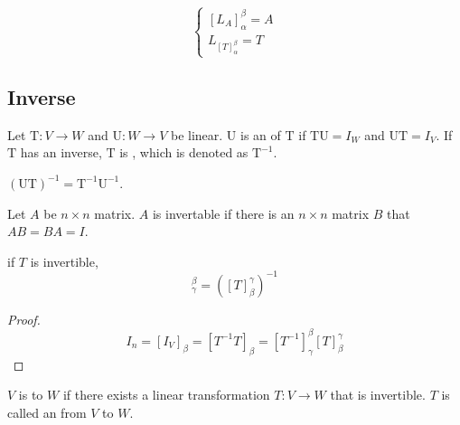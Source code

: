 \begin{theorem}
    \begin{equation}
        \begin{cases}
            [L_A]_\alpha^\beta = A \\
            L_{[T]_\alpha^\beta} = T
        \end{cases}
    \end{equation}
\end{theorem}


\subsection{Inverse}

\begin{definition}
	Let $\mathrm{T}: V\rightarrow W$ and $\mathrm{U}:W \rightarrow V$ be linear. $\mathrm{U}$ is an    of $\mathrm{T}$ if $\mathrm{TU} = I_W$ and $\mathrm{UT} = I_V$. If $\mathrm{T}$ has an inverse, $\mathrm{T}$ is   , which is denoted as $\mathrm{T}^{-1}$.
\end{definition}

\begin{theorem}
    $(\mathrm{UT})^{-1} = \mathrm{T}^{-1} \mathrm{U}^{-1}$.
\end{theorem}

\begin{definition}
	Let $A$ be $n \times n$ matrix. $A$ is invertable if there is an $n \times n$ matrix $B$ that $AB=BA=I$.
\end{definition}

\begin{theorem}
    if $T$ is invertible, 
	\begin{equation*}
		[T^{-1}]_\gamma^\beta = ([T]_\beta^\gamma)^{-1}
	\end{equation*}
\end{theorem}
\begin{proof}
	\begin{equation*}
		I_n = [I_V]_\beta = [T^{-1} T]_\beta = [T^{-1}]_\gamma^\beta [T]_\beta^\gamma
	\end{equation*}
\end{proof}

\begin{definition}
	$V$ is  to $W$ if there exists a linear transformation $T:V\rightarrow W$ that is invertible. $T$ is called an   from $V$ to $W$.
\end{definition}

